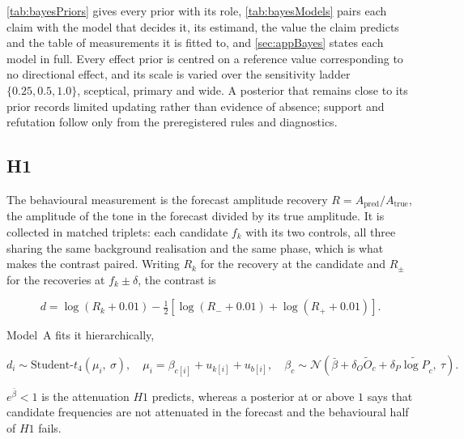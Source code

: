 



\autoref{tab:bayesPriors} gives every prior with its role, \autoref{tab:bayesModels} pairs each claim with the model that decides it, its estimand, the value the claim predicts and the table of measurements it is fitted to, and \autoref{sec:appBayes} states each model in full. Every effect prior is centred on a reference value corresponding to no directional effect, and its scale is varied over the sensitivity ladder $\{0.25,0.5,1.0\}$, sceptical, primary and wide. A posterior that remains close to its prior records limited updating rather than evidence of absence; support and refutation follow only from the preregistered rules and diagnostics.

\subsection{H1}

The behavioural measurement is the forecast amplitude recovery $R=A_{\text{pred}}/A_{\text{true}}$, the amplitude of the tone in the forecast divided by its true amplitude. It is collected in matched triplets: each candidate $f_k$ with its two controls, all three sharing the same background realisation and the same phase, which is what makes the contrast paired. Writing $R_k$ for the recovery at the candidate and $R_{\pm}$ for the recoveries at $f_k\pm\delta$, the contrast is

\begin{equation}
\label{eq:d2contrast}
d = \log(R_k + 0.01) - \tfrac{1}{2}\left[\log(R_- + 0.01) + \log(R_+ + 0.01)\right].
\end{equation}

Model~A fits it hierarchically,

\begin{equation}
\label{eq:d2hier}
d_i \sim \text{Student-}t_4(\mu_i,\ \sigma),
\quad
\mu_i = \beta_{c[i]} + u_{k[i]} + u_{b[i]},
\quad
\beta_c \sim \mathcal{N}\!\left(\bar\beta + \delta_O \widetilde O_c + \delta_P \widetilde{\log P}_c,\ \tau\right).
\end{equation}

$e^{\bar\beta}<1$ is the attenuation $H1$ predicts, whereas a posterior at or above $1$ says that candidate frequencies are not attenuated in the forecast and the behavioural half of $H1$ fails.

